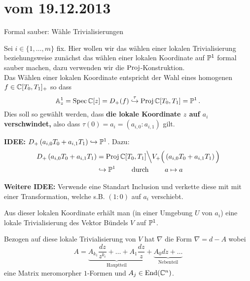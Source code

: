 \section*{vom 19.12.2013}

\begin{ex}
Formal sauber: Wähle Trivialisierungen
\end{ex}
Sei $i\in\{1,\dots,m\}$ fix.
Hier wollen wir das wählen einer lokalen Trivialisierung beziehungsweise
zunächst das wählen einer lokalen Koordinate auf $\P^1$ formal sauber machen,
dazu verwenden wir die $\Proj$-Konstruktion.\\
Das Wählen einer lokalen Koordinate entspricht der Wahl eines homogenen
$f\in\C[T_0,T_1]_+$ so dass
\[
\A_z^1=\Spec\C[z]=D_+(f)
\overset{\tau}\hookrightarrow
\Proj\C[T_0,T_1]=\P^1 \,.
\]
Dies soll so gewählt werden, dass \textbf{\boldmath die lokale Koordinate $z$
auf $a_i$ verschwindet,} also dass $\tau(0)=a_i=(a_{i,0}:a_{i,1})$ gilt.

\textbf{IDEE:} $D_+\left(a_{i,0}T_0 + a_{i,1}T_1\right)\hookrightarrow \P^1$.
Dazu: 
\begin{align*}
D_+\left(a_{i,0}T_0 + a_{i,1}T_1\right)
  &=\Proj \C[T_0,T_1]\Big\backslash 
    V_+\Big(\left(a_{i,0}T_0 + a_{i,1}T_1\right)\Big)
\\&\hookrightarrow\P^1
    \qquad \text{ durch } \qquad a\mapsto a
\end{align*}
\begin{comment}
\textbf{Fall:} $a=(1:0)$ dann ist $\A^1\cong D_+(T_1)\hookrightarrow \P^1$
durch $x \mapsto (1,z)$
\end{comment}
\textbf{Weitere IDEE:}
Verwende eine Standart Inclusion und verkette diese mit mit einer
Transformation, welche s.B. $(1:0)$ auf $a_i$ verschiebt.

Aus dieser lokalen Koordinate erhält man (in einer Umgebung $U$ von $a_i$) eine
lokale Trivialisierung des Vektor Bündels $V$ auf $\P^1$.
\begin{comment}
Wähle an einem Punkt und setze von dort aus fort?!?
\end{comment}
Bezogen auf diese lokale Trivialisierung von $V$ hat $\nabla$ die Form
$\nabla=d-A$ wobei
\[
A=\underset{\text{Hauptteil}}{\underbrace{
    A_{k_1}\frac{dz}{z^{k_i}} +\dots+ A_{1}\frac{dz}{z}
  }} +
  \underset{\text{Nebenteil}}{\underbrace{A_0dz +\dots}}
\]
eine Matrix meromorpher $1$-Formen und $A_j\in\End(\C^n)$.
\begin{comment}
\begin{defn}
Eine meromorphe $1$-Form ist ein Element $\omega\in\Omega^1(V;\C)$ welche sich
als $\omega=udz$ mit meromorphen $u$ schreiben lässt.
\end{defn}
\end{comment}
\TODO

